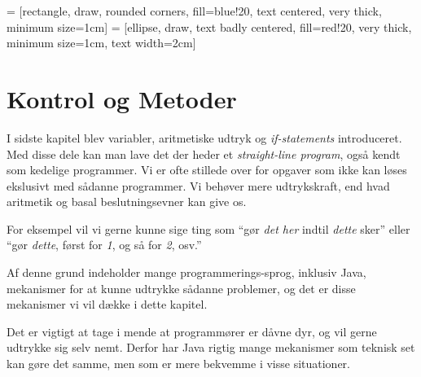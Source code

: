 

\usetikzlibrary{shapes,arrows}

  = [rectangle, draw, rounded corners, fill=blue!20, text centered, very thick, minimum size=1cm]
 = [ellipse, draw, text badly centered, fill=red!20, very thick, minimum size=1cm, text width=2cm]


\chapter{Kontrol og Metoder}






    I sidste kapitel blev variabler, aritmetiske udtryk og
    \emph{if-statements} introduceret. Med disse dele kan man lave det
    der heder et \emph{straight-line program}, også kendt som kedelige
    programmer. Vi er ofte stillede over for opgaver som ikke kan
    løses ekslusivt med sådanne programmer. Vi behøver mere
    udtrykskraft, end hvad aritmetik og basal beslutningsevner kan
    give os.

    For eksempel vil vi gerne kunne sige ting som ``gør \emph{det her} indtil
	\emph{dette} sker'' eller ``gør \emph{dette}, først for \emph{1}, og så for
	\emph{2}, osv.''

	Af denne grund indeholder mange programmerings-sprog, inklusiv Java,
	mekanismer for at kunne udtrykke sådanne problemer, og det er disse
	mekanismer vi vil dække i dette kapitel.

	Det er vigtigt at tage i mende at programmører er dåvne dyr, og vil gerne
	udtrykke sig selv nemt. Derfor har Java rigtig mange mekanismer som teknisk
	set kan gøre det samme, men som er mere bekvemme i visse situationer.


